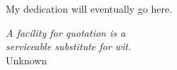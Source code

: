 %
\begin{frontmatter}

%
%
\makefrontmatter

%
%
%
%
%
%
\begin{dedication}
  My dedication will eventually go here. %
\end{dedication}


%
%



%
%
\begin{epigraph} %
  \emph{A facility for quotation is a\\
  serviceable substitute for wit.}\\
Unknown
\end{epigraph}

%



\end{frontmatter}

